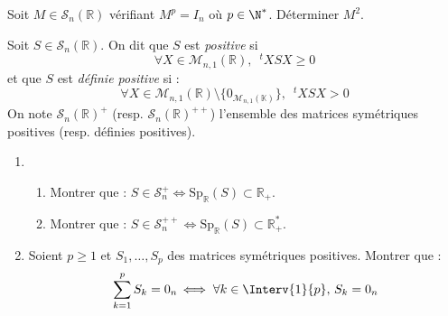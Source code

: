 \documentclass[a4paper,10pt]{report}
\begin{document}
\begin{Exa} Soit $M \in  \mathcal{S}_{n}(\mathbb{R})$ vérifiant $M^{p}= I_{n}$ où $p \in \N^{*}$. Déterminer $M^2$.
\end{Exa}



\begin{Exa} Soit $S \in \mathcal{S}_n(\mathbb{R})$. On dit que $S$ est \textit{positive} si
$$ \forall X \in \mathcal{M}_{n,1}(\mathbb{R}), \; ~^tX S X \geq 0$$
et que $S$ est \textit{définie positive} si :
$$ \forall X \in \mathcal{M}_{n,1}(\mathbb{R}) \setminus \lbrace 0_{\mathcal{M}_{n,1}(\mathbb{K})} \rbrace, \; ~^tX S X > 0$$
On note $\mathcal{S}_n(\mathbb{R})^+$ (resp. $\mathcal{S}_n(\mathbb{R})^{++}$) l'ensemble des matrices symétriques positives (resp. définies positives).

\begin{enumerate}
\item 
\begin{enumerate}
\item Montrer que : $S \in \mathcal{S}_n^+ \Longleftrightarrow \textrm{Sp}_{\mathbb{R}}(S) \subset \mathbb{R}_+$.
\item Montrer que : $S \in \mathcal{S}_n^{++} \Longleftrightarrow \textrm{Sp}_{\mathbb{R}}(S) \subset \mathbb{R}_+^{*}$.
\end{enumerate}
\item Soient $p \geq 1$ et $S_1, \ldots, S_p$ des matrices symétriques positives. Montrer que :
$$ \sum_{k=1}^p S_k = 0_n  \, \Longleftrightarrow \;  \forall k \in \Interv{1}{p}, \, S_k = 0_n $$
\end{enumerate}
\end{Exa}
\end{document}
